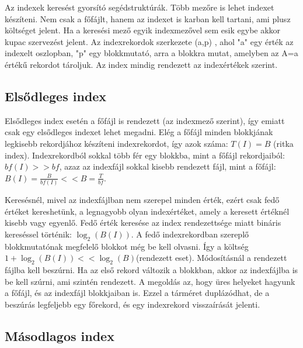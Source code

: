\documentclass[margin=0px]{article}
\begin{document}
	Az indexek keresést gyorsító segédstruktúrák. Több mezőre is lehet indexet készíteni. Nem csak a
	főfájlt, hanem az indexet is karban kell tartani, ami plusz költséget jelent. Ha a keresési mező egyik
	indexmezővel sem esik egybe akkor kupac szervezést jelent. Az indexrekordok szerkezete (a,p) , ahol
	"a" egy  érték  az  indexelt  oszlopban, "p" egy  blokkmutató, arra a  blokkra mutat, amelyben az A=a
	értékű rekordot tároljuk. Az index mindig rendezett az indexértékek szerint.
	
	\subsection{Elsődleges index}
	
	Elsődleges index esetén a főfájl  is  rendezett  (az  indexmező  szerint), így emiatt csak egy elsődleges 
	indexet lehet megadni.  Elég  a  főfájl  minden  blokkjának  legkisebb  rekordjához  készíteni 
	indexrekordot, így azok száma: $T(I)  = B$ (ritka index). Indexrekordból sokkal több fér egy blokkba, mint 
	a  főfájl  rekordjaiból:  $bf(I)  >> bf$,  azaz  az  indexfájl  sokkal  kisebb  rendezett  fájl,  mint  a  főfájl:
	$B(I) = \frac{B}{bf(I)} << B = \frac{T}{bf}$. 
	
	Keresésnél, mivel az indexfájlban nem szerepel minden érték, ezért csak fedő értéket kereshetünk, a 
	legnagyobb olyan indexértéket, amely a keresett értéknél kisebb vagy egyenlő. Fedő érték keresése 
	az index rendezettsége miatt bináris kereséssel történik: $\log_{2}(B(I))$. A fedő indexrekordban szereplő 
	blokkmutatónak megfelelő blokkot még be kell olvasni. Így a költség $1+\log_{2}(B(I)) << \log_{2}(B)$(rendezett 
	eset).
	Módosításnál a rendezett fájlba kell beszúrni. Ha az első rekord változik a blokkban, akkor az 
	indexfájlba is be kell szúrni, ami szintén rendezett. A megoldás az, hogy üres helyeket hagyunk a 
	főfájl, és az indexfájl blokkjaiban is. Ezzel a tárméret duplázódhat, de a beszúrás legfeljebb egy 
	főrekord, és egy indexrekord visszaírását jelenti.
	
	\subsection{Másodlagos index}
	
\end{document}
